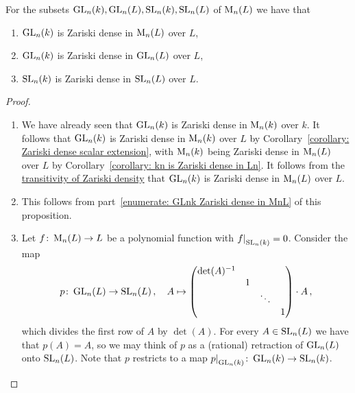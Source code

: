 \begin{proposition}
  \leavevmode
  For the subsets $\operatorname{GL}_n(k), \operatorname{GL}_n(L), \operatorname{SL}_n(k), \operatorname{SL}_n(L)$ of $\operatorname{M}_n(L)$ we have that
  \begin{enumerate}
    \item
      \label{enumerate: GLnk Zariski dense in MnL}
      $\operatorname{GL}_n(k)$ is Zariski dense in $\operatorname{M}_n(L)$ over $L$,
    \item
      $\operatorname{GL}_n(k)$ is Zariski dense in $\operatorname{GL}_n(L)$ over $L$,
    \item
      $\operatorname{SL}_n(k)$ is Zariski dense in $\operatorname{SL}_n(L)$ over $L$.
  \end{enumerate}
\end{proposition}
\begin{proof}
  \leavevmode
  \begin{enumerate}
    \item
      We have already seen that $\operatorname{GL}_n(k)$ is Zariski dense in $\operatorname{M}_n(k)$ over $k$.
      It follows that $\operatorname{GL}_n(k)$ is Zariski dense in $\operatorname{M}_n(k)$ over $L$ by Corollary~\ref{corollary: Zariski dense scalar extension}, with $\operatorname{M}_n(k)$ being Zariski dense in $\operatorname{M}_n(L)$ over $L$ by Corollary~\ref{corollary: kn is Zariski dense in Ln}.
      It follows from the \hyperref[lemma: transitivity of Zariski density]{transitivity of Zariski density} that $\operatorname{GL}_n(k)$ is Zariski dense in $\operatorname{M}_n(L)$ over $L$.
    \item
      This follows from part~\ref*{enumerate: GLnk Zariski dense in MnL} of this proposition.
    \item
      Let $f \colon \operatorname{M}_n(L) \to L$ be a polynomial function with $\restrict{f}{\SL_n(k)} = 0$.
      Consider the map
      \[
                p
        \colon  \operatorname{GL}_n(L)
        \to     \operatorname{SL}_n(L) \,,
        \quad   A
        \mapsto \begin{pmatrix}
                  \det(A)^{-1}  &   &         &     \\
                                & 1 &         &     \\
                                &   & \ddots  &     \\
                                &   &         & 1
                \end{pmatrix}
                \cdot
                A \,,
      \]
      which divides the first row of $A$ by $\det(A)$.
      For every $A \in \operatorname{SL}_n(L)$ we have that $p(A) = A$, so we may think of $p$ as a (rational) retraction of $\operatorname{GL}_n(L)$ onto $\operatorname{SL}_n(L)$.
      Note that $p$ restricts to a map $\restrict{p}{\GL_n(k)} \colon \GL_n(k) \to \SL_n(k)$.
      

\end{enumerate}
\end{proof}
